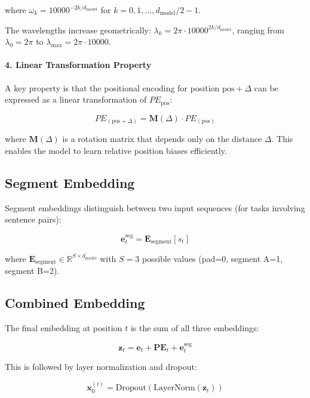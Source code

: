 \documentclass[11pt,a4paper]{article}
\begin{document}
where $\omega_k = 10000^{-2k/d_{\text{model}}}$ for $k = 0, 1, \ldots, d_{\text{model}}/2 - 1$.

The wavelengths increase geometrically: $\lambda_k = 2\pi \cdot 10000^{2k/d_{\text{model}}}$, ranging from $\lambda_0 = 2\pi$ to $\lambda_{\max} = 2\pi \cdot 10000$.

\paragraph{4. Linear Transformation Property}
A key property is that the positional encoding for position $\text{pos} + \Delta$ can be expressed as a linear transformation of $PE_{\text{pos}}$:

\begin{equation}
PE_{(\text{pos}+\Delta)} = \mathbf{M}(\Delta) \cdot PE_{(\text{pos})}
\end{equation}

where $\mathbf{M}(\Delta)$ is a rotation matrix that depends only on the distance $\Delta$. This enables the model to learn relative position biases efficiently.

\subsection{Segment Embedding}

Segment embeddings distinguish between two input sequences (for tasks involving sentence pairs):

\begin{equation}
\mathbf{e}^{\text{seg}}_t = \mathbf{E}_{\text{segment}}[s_t]
\end{equation}

where $\mathbf{E}_{\text{segment}} \in \mathbb{R}^{S \times d_{\text{model}}}$ with $S=3$ possible values (pad=0, segment A=1, segment B=2).

\subsection{Combined Embedding}

The final embedding at position $t$ is the sum of all three embeddings:

\begin{equation}
\mathbf{z}_t = \mathbf{e}_t + \mathbf{PE}_t + \mathbf{e}^{\text{seg}}_t
\end{equation}

This is followed by layer normalization and dropout:

\begin{equation}
\mathbf{x}_0^{(t)} = \text{Dropout}(\text{LayerNorm}(\mathbf{z}_t))
\end{equation}
\end{document}
